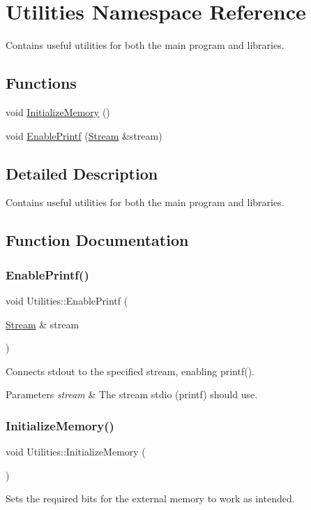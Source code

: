 \hypertarget{namespace_utilities}{}\section{Utilities Namespace Reference}
\label{namespace_utilities}


Contains useful utilities for both the main program and libraries.  


\subsection*{Functions}
\begin{DoxyCompactItemize}
\item 
void \hyperlink{namespace_utilities_a14c0a3f1f90211299420224181e599b3}{Initialize\+Memory} ()
\item 
void \hyperlink{namespace_utilities_a7175bc91000cbd130685885c6a24ea9a}{Enable\+Printf} (\hyperlink{class_stream}{Stream} \&stream)
\end{DoxyCompactItemize}


\subsection{Detailed Description}
Contains useful utilities for both the main program and libraries. 

\subsection{Function Documentation}
\hypertarget{namespace_utilities_a7175bc91000cbd130685885c6a24ea9a}{}\label{namespace_utilities_a7175bc91000cbd130685885c6a24ea9a} 
\subsubsection{\texorpdfstring{Enable\+Printf()}{EnablePrintf()}}
{\footnotesize\ttfamily void Utilities\+::\+Enable\+Printf (\begin{DoxyParamCaption}\item[{\hyperlink{class_stream}{Stream} \&}]{stream }\end{DoxyParamCaption})}

Connects stdout to the specified stream, enabling printf(). 
\begin{DoxyParams}{Parameters}
{\em stream} & The stream stdio (printf) should use. \\
\hline
\end{DoxyParams}
\hypertarget{namespace_utilities_a14c0a3f1f90211299420224181e599b3}{}\label{namespace_utilities_a14c0a3f1f90211299420224181e599b3} 
\subsubsection{\texorpdfstring{Initialize\+Memory()}{InitializeMemory()}}
{\footnotesize\ttfamily void Utilities\+::\+Initialize\+Memory (\begin{DoxyParamCaption}{ }\end{DoxyParamCaption})}

Sets the required bits for the external memory to work as intended. 